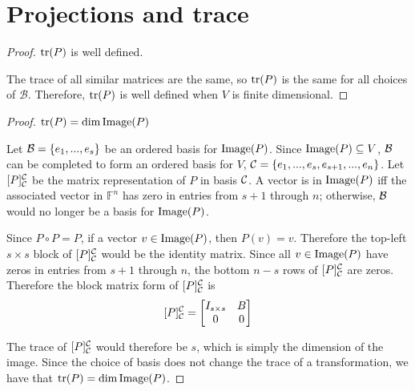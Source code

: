 \section{Projections and trace}

\begin{proof} $\text{tr}(P)$ is well defined.\gap

    The trace of all similar matrices are the same, so
    $\text{tr}(P)$ is the same for all choices of $\mathcal{B}$.
    Therefore, $\text{tr}(P)$ is well defined 
    when $V$ is finite dimensional.
\end{proof}

\begin{proof}$\text{tr}(P) = \dim \text{Image}(P)$\gap

    Let $\mathcal{B} = \{e_1,...,e_s\}$ be an ordered basis for $\text{Image}(P)$.
    Since $\text{Image}(P) \subseteq V$, 
    $\mathcal{B}$ can be completed to form an ordered basis for $V$,
    $\mathcal{C} = \{e_1,...,e_s,e_{s+1},...,e_n\}$.
    Let $[P]_{\mathcal{C}}^{\mathcal{C}}$ be the matrix representation 
    of $P$ in basis $\mathcal{C}$.
    A vector is in $\text{Image}(P)$ iff the associated vector in $\mathbb{F}^n$
    has zero in entries from $s+1$ through $n$; 
    otherwise, $\mathcal{B}$ would no longer be a basis for $\text{Image}(P)$.\gap

    Since $P \circ P = P$, 
    if a vector $v \in \text{Image}(P)$, then $P(v) = v$.
    Therefore the top-left $s \times s$ block of $[P]_{\mathcal{C}}^{\mathcal{C}}$
    would be the identity matrix.
    Since all $v \in \text{Image}(P)$ have zeros in entries from $s+1$ through $n$,
    the bottom $n-s$ rows of $[P]_{\mathcal{C}}^{\mathcal{C}}$ are zeros.
    Therefore the block matrix form of $[P]_{\mathcal{C}}^{\mathcal{C}}$ is
    \[ 
    [P]_{\mathcal{C}}^{\mathcal{C}} =
    \begin{bmatrix}
        I_{s \times s} & B \\
        0 & 0
    \end{bmatrix}
    \]

    The trace of $[P]_{\mathcal{C}}^{\mathcal{C}}$ would therefore be $s$, which is simply
    the dimension of the image.
    Since the choice of basis does not change the trace of a transformation,
    we have that $\text{tr}(P) = \dim \text{Image}(P)$. 
\end{proof}